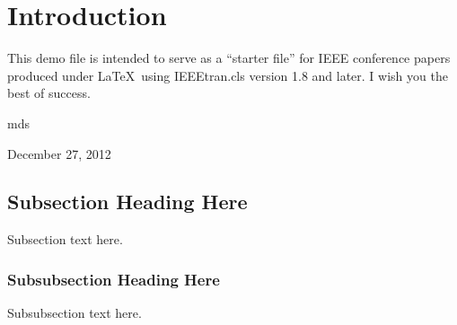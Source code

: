 \section{Introduction}
This demo file is intended to serve as a ``starter file''
for IEEE conference papers produced under \LaTeX\ using
IEEEtran.cls version 1.8 and later.
I wish you the best of success.

\hfill mds

\hfill December 27, 2012

\subsection{Subsection Heading Here}
Subsection text here.


\subsubsection{Subsubsection Heading Here}
Subsubsection text here.